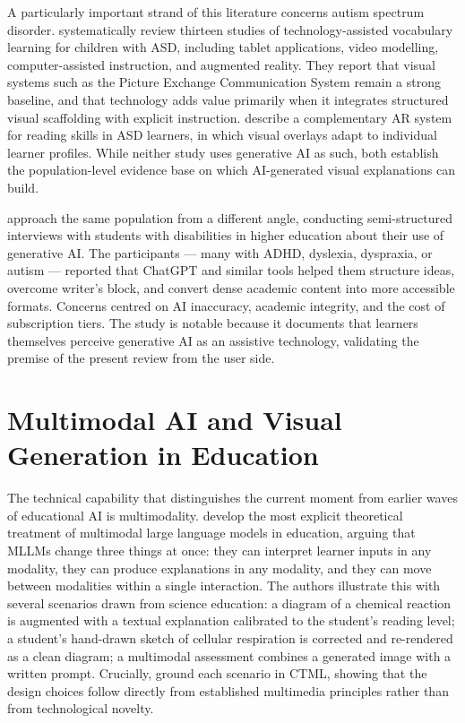 A particularly important strand of this literature concerns autism spectrum disorder. \citet{urrea2024} systematically review thirteen studies of technology-assisted vocabulary learning for children with ASD, including tablet applications, video modelling, computer-assisted instruction, and augmented reality. They report that visual systems such as the Picture Exchange Communication System remain a strong baseline, and that technology adds value primarily when it integrates structured visual scaffolding with explicit instruction. \citet{khoirunnisa2024} describe a complementary AR system for reading skills in ASD learners, in which visual overlays adapt to individual learner profiles. While neither study uses generative AI as such, both establish the population-level evidence base on which AI-generated visual explanations can build.

\citet{buhler2024} approach the same population from a different angle, conducting semi-structured interviews with students with disabilities in higher education about their use of generative AI. The participants --- many with ADHD, dyslexia, dyspraxia, or autism --- reported that ChatGPT and similar tools helped them structure ideas, overcome writer's block, and convert dense academic content into more accessible formats. Concerns centred on AI inaccuracy, academic integrity, and the cost of subscription tiers. The study is notable because it documents that learners themselves perceive generative AI as an assistive technology, validating the premise of the present review from the user side.

\section{Multimodal AI and Visual Generation in Education}

The technical capability that distinguishes the current moment from earlier waves of educational AI is multimodality. \citet{bewersdorff2024} develop the most explicit theoretical treatment of multimodal large language models in education, arguing that MLLMs change three things at once: they can interpret learner inputs in any modality, they can produce explanations in any modality, and they can move between modalities within a single interaction. The authors illustrate this with several scenarios drawn from science education: a diagram of a chemical reaction is augmented with a textual explanation calibrated to the student's reading level; a student's hand-drawn sketch of cellular respiration is corrected and re-rendered as a clean diagram; a multimodal assessment combines a generated image with a written prompt. Crucially, \citet{bewersdorff2024} ground each scenario in CTML, showing that the design choices follow directly from established multimedia principles rather than from technological novelty.

